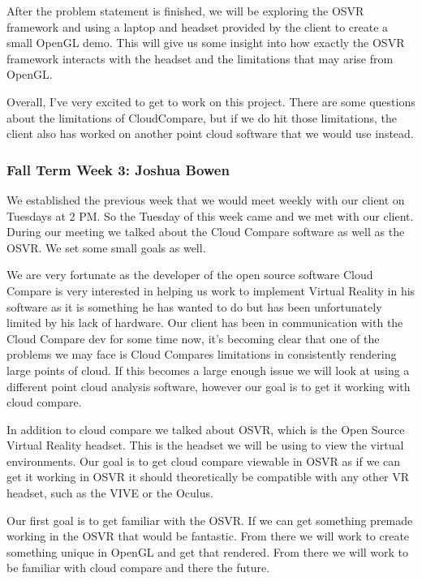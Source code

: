 \documentclass[draftclsnofoot,onecolumn]{IEEEtran}
\begin{document}
After the problem statement is finished, we will be exploring the OSVR framework and using a laptop and headset provided by the client to create a small OpenGL demo. 
This will give us some insight into how exactly the OSVR framework interacts with the headset and the limitations that may arise from OpenGL.

Overall, I've very excited to get to work on this project. 
There are some questions about the limitations of CloudCompare, but if we do hit those limitations, the client also has worked on another point cloud software that we would use instead.

\subsubsection{Fall Term Week 3: Joshua Bowen}

We established the previous week that we would meet weekly with our client on Tuesdays at 2 PM. 
So the Tuesday of this week came and we met with our client. During our meeting we talked about the Cloud Compare software as well as the OSVR. 
We set some small goals as well.

We are very fortunate as the developer of the open source software Cloud Compare is very interested in helping us work to implement Virtual Reality in his software as it is something he has wanted to do but has been unfortunately limited by his lack of hardware. 
Our client has been in communication with the Cloud Compare dev for some time now, it's becoming clear that one of the problems we may face is Cloud Compares limitations in consistently rendering large points of cloud. 
If this becomes a large enough issue we will look at using a different point cloud analysis software, however our goal is to get it working with cloud compare.

In addition to cloud compare we talked about OSVR, which is the Open Source Virtual Reality headset. 
This is the headset we will be using to view the virtual environments. Our goal is to get cloud compare viewable in OSVR as if we can get it working in OSVR it should theoretically be compatible with any other VR headset, such as the VIVE or the Oculus.

Our first goal is to get familiar with the OSVR. 
If we can get something premade working in the OSVR that would be fantastic. 
From there we will work to create something unique in OpenGL and get that rendered. From there we will work to be familiar with cloud compare and there the future.
\end{document}
